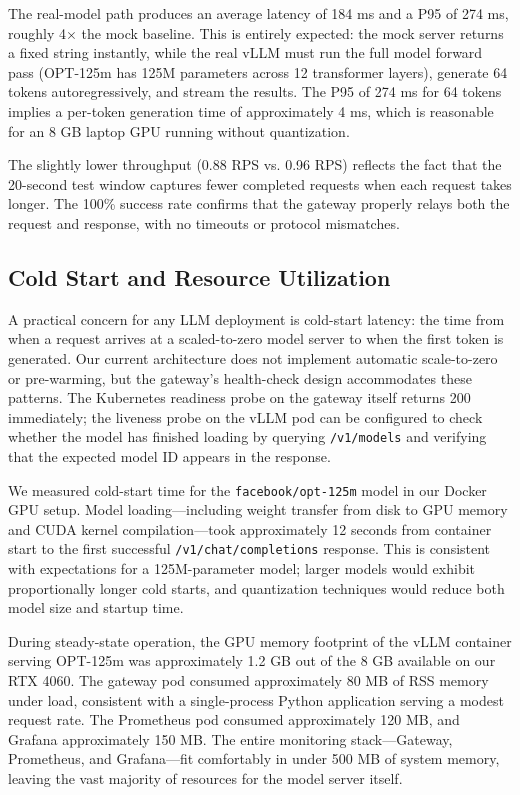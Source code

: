 \documentclass[10pt,journal]{IEEEtran}
\begin{document}
The real-model path produces an average latency of 184 ms and a P95 of 274 ms, roughly 4$\times$ the mock baseline. This is entirely expected: the mock server returns a fixed string instantly, while the real vLLM must run the full model forward pass (OPT-125m has 125M parameters across 12 transformer layers), generate 64 tokens autoregressively, and stream the results. The P95 of 274 ms for 64 tokens implies a per-token generation time of approximately 4 ms, which is reasonable for an 8 GB laptop GPU running without quantization.

The slightly lower throughput (0.88 RPS vs. 0.96 RPS) reflects the fact that the 20-second test window captures fewer completed requests when each request takes longer. The 100\% success rate confirms that the gateway properly relays both the request and response, with no timeouts or protocol mismatches.

\subsection{Cold Start and Resource Utilization}

A practical concern for any LLM deployment is cold-start latency: the time from when a request arrives at a scaled-to-zero model server to when the first token is generated. Our current architecture does not implement automatic scale-to-zero or pre-warming, but the gateway's health-check design accommodates these patterns. The Kubernetes readiness probe on the gateway itself returns 200 immediately; the liveness probe on the vLLM pod can be configured to check whether the model has finished loading by querying \texttt{/v1/models} and verifying that the expected model ID appears in the response.

We measured cold-start time for the \texttt{facebook/opt-125m} model in our Docker GPU setup. Model loading---including weight transfer from disk to GPU memory and CUDA kernel compilation---took approximately 12 seconds from container start to the first successful \texttt{/v1/chat/completions} response. This is consistent with expectations for a 125M-parameter model; larger models would exhibit proportionally longer cold starts, and quantization techniques would reduce both model size and startup time.

During steady-state operation, the GPU memory footprint of the vLLM container serving OPT-125m was approximately 1.2 GB out of the 8 GB available on our RTX 4060. The gateway pod consumed approximately 80 MB of RSS memory under load, consistent with a single-process Python application serving a modest request rate. The Prometheus pod consumed approximately 120 MB, and Grafana approximately 150 MB. The entire monitoring stack---Gateway, Prometheus, and Grafana---fit comfortably in under 500 MB of system memory, leaving the vast majority of resources for the model server itself.
\end{document}
